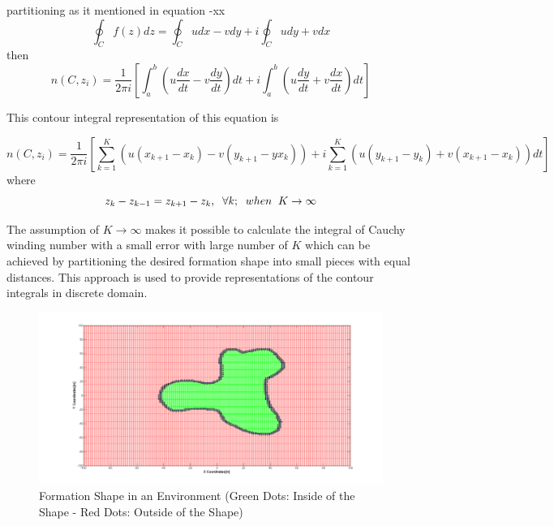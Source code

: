\documentclass[twoside]{article}
\begin{document}
		partitioning as it mentioned in equation -xx
		\begin{equation}
\oint_C f(z)dz  = \oint_C u dx - v dy + i \oint_C u dy + v dx 
		\end{equation}
		then
		\begin{equation}
n(C,z_i)  = \frac{1}{2\pi i} \left[\int_{a}^{b} \left(u\frac{dx}{dt} - v\frac{dy}{dt}\right)dt + i\int_{a}^{b}\left(u\frac{dy}{dt} + v\frac{dx}{dt}\right)dt\right]
		\end{equation}
		
		This contour integral representation of this equation is
		
		\begin{equation}
n(C,z_i)  = \frac{1}{2\pi i} \left[\sum_{k=1}^{K} \left(u(x_{k+1} - x_k ) - v(y_{k+1} -yx_k )\right) + i\sum_{k=1}^{K}\left(u(y_{k+1} - y_k ) + v(x_{k+1} - x_k )\right)dt\right]
		\end{equation}
		where
		\begin{equation}
z_k - z_{k-1} = z_{k+1} - z_k, \hspace{0.2cm}  \forall k ;  \hspace{0.2cm} when  \hspace{0.2cm} K \to\infty
		\end{equation}

		
The assumption of $K \to\infty$ makes it possible to calculate the integral of Cauchy winding number with a small error with large number of $K$ which can be achieved by partitioning the desired formation shape  into small pieces with equal  distances. This approach is used to provide representations of the contour integrals in discrete domain. 

			\begin{figure}[H]
				\caption{Formation Shape in an Environment (Green Dots: Inside of the Shape - Red Dots: Outside of the Shape)}
				\centering			
				\includegraphics[scale = 0.30]{iceride_disarida}

			\end{figure}
\end{document}
